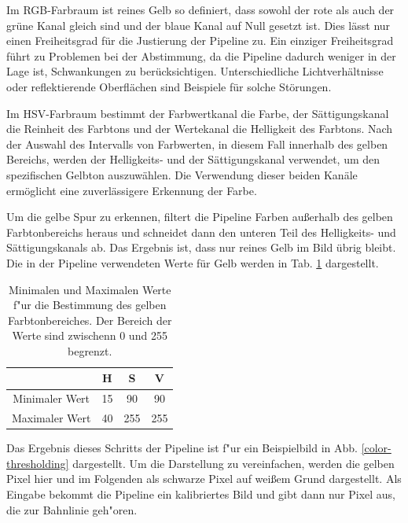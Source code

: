 \documentclass[arbeit=studie,oneside,BCOR=12mm]{ArbeitRST}
\begin{document}
Im RGB-Farbraum ist reines Gelb so definiert, dass sowohl der rote als auch der
grüne Kanal gleich sind und der blaue Kanal auf Null gesetzt ist. Dies lässt
nur einen Freiheitsgrad für die Justierung der Pipeline zu.  Ein einziger
Freiheitsgrad führt zu Problemen bei der Abstimmung, da die Pipeline dadurch
weniger in der Lage ist, Schwankungen zu berücksichtigen. Unterschiedliche
Lichtverhältnisse oder reflektierende Oberflächen sind Beispiele für solche
Störungen.

Im HSV-Farbraum bestimmt der Farbwertkanal die Farbe, der Sättigungskanal die
Reinheit des Farbtons und der Wertekanal die Helligkeit des Farbtons.
\cite{hsv} Nach der Auswahl des Intervalls von Farbwerten, in diesem Fall
innerhalb des gelben Bereichs, werden der Helligkeits- und der Sättigungskanal
verwendet, um den spezifischen Gelbton auszuwählen. Die Verwendung dieser
beiden Kanäle ermöglicht eine zuverlässigere Erkennung der Farbe.

Um die gelbe Spur zu erkennen, filtert die Pipeline Farben außerhalb des gelben
Farbtonbereichs heraus und schneidet dann den unteren Teil des Helligkeits- und
Sättigungskanals ab. Das Ergebnis ist, dass nur reines Gelb im Bild übrig
bleibt. Die in der Pipeline verwendeten Werte für Gelb werden in Tab.
\ref{hsvtable} dargestellt. \\

\begin{table}[h]
\begin{center}
\begin{tabular}{|c|c|c|c|}
\hline
    & H & S & V\\
\hline
\hline
    Minimaler Wert & 15 & 90 & 90 \\
\hline
    Maximaler Wert & 40 & 255 & 255 \\
\hline
\end{tabular}
    \caption{Minimalen und Maximalen Werte f"ur die Bestimmung des gelben Farbtonbereiches. Der Bereich
    der Werte sind zwischenn 0 und 255 begrenzt.}
    \label{hsvtable}
\end{center}
\end{table}

Das Ergebnis dieses Schritts der Pipeline ist f"ur ein Beispielbild in Abb.
\ref{color-thresholding} dargestellt. Um die Darstellung zu vereinfachen,
werden die gelben Pixel hier und im Folgenden als schwarze Pixel auf wei{\ss}em
Grund dargestellt. Als Eingabe bekommt die Pipeline ein kalibriertes Bild und 
gibt dann nur Pixel aus, die zur Bahnlinie geh"oren. \\
\end{document}
